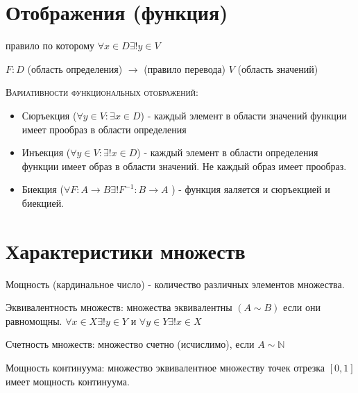 \documentclass[14pt]{extreport}
\begin{document}
        \section{Отображения (функция)}
        \begin{definition}
            правило по которому $\forall x \in D \exists !y \in V$ 
        \end{definition}
            $F: D$ (область определения) $\rightarrow $ (правило перевода) $V $  (область значений)

            \textsc{Вариативности функциональных отображений:}
            \begin{itemize}
                \item Сюръекция ($\forall y \in V: \exists x \in D$) - каждый элемент в области значений функции имеет прообраз в области определения
                \item Инъекция ($ \forall y \in V : \exists ! x \in D$) - каждый элемент в области определения функции имеет образ в области значений. Не каждый образ имеет прообраз. 
                \item Биекция ($ \forall F : A \rightarrow B \exists ! F^{-1} : B \rightarrow A $ ) - функция яаляется и сюръекцией и биекцией. 
            \end{itemize}
        
        \section{Характеристики множеств}
            \begin{definition}
                Мощность (кардинальное число) -  количество различных элементов множества. 
            \end{definition}

            \begin{definition}
                Эквивалентность множеств: множества эквивалентны $(A \sim B)$ если они равномощны. $\forall x \in X \exists ! y \in Y$ и $\forall y \in Y \exists ! x \in X$
            \end{definition}
                
            \begin{definition}
                Счетность множеств: множество счетно (исчислимо), если $A \sim \mathbb{N}$ 
            \end{definition}

            \begin{definition}
                Мощность континуума: множество эквивалентное множеству точек отрезка $[0,1]$ имеет мощность континуума.
            \end{definition}
            
\end{document}
